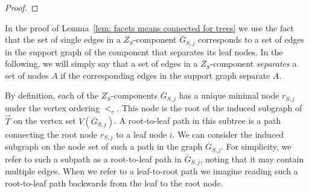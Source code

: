 \begin{proof}
% 
\end{proof}

In the proof of Lemma~\ref{lem: facets means connected for trees} we use the fact that the set of single edges in a $Z_S$-component $\overline{G}_{S,j}$ corresponds to a set of edges in the support graph of the component that separates its leaf nodes. 
In the following, we will simply say that a set of edges in a $Z_S$-component \emph{separates} a set of nodes $A$ if the corresponding edges in the support graph separate $A$. 

By definition, each of the $Z_S$-components $\overline{G}_{S,j}$ has a unique minimal node $r_{S,j}$ under the vertex ordering $<_r$.  
This node is the root of the induced subgraph of $\overrightarrow{T}$ on the vertex set $V(\overline{G}_{S,j})$.  
A root-to-leaf path in this subtree is a path connecting the root node $r_{S,j}$ to a leaf node $i$.  
We can consider the induced subgraph on the node set of such a path in the graph $\overline{G}_{S,j}$.  
For simplicity, we refer to such a subpath as a root-to-leaf path in $\overline{G}_{S,j}$, noting that it may contain multiple edges.  
When we refer to a leaf-to-root path we imagine reading such a root-to-leaf path backwards from the leaf to the root node. 


